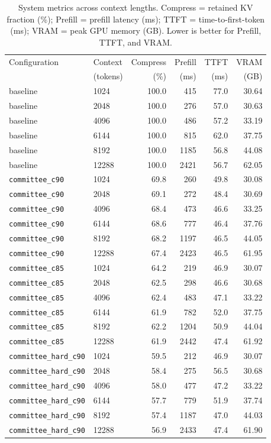 \documentclass[letterpaper]{article} %
\begin{document}
\begin{table}[t]
\centering
\small
\caption{System metrics across context lengths. Compress = retained KV fraction (\%);
Prefill = prefill latency (ms); TTFT = time-to-first-token (ms);
VRAM = peak GPU memory (GB). Lower is better for Prefill, TTFT, and VRAM.}
\label{tab:system_metrics}
\begin{tabular}{llrrrr}
\toprule
Configuration & Context & Compress & Prefill & TTFT & VRAM \\
              & (tokens) & (\%) & (ms) & (ms) & (GB) \\
\midrule
baseline            & 1024  & 100.0 & 415  & 77.0 & 30.64 \\
baseline            & 2048  & 100.0 & 276  & 57.0 & 30.63 \\
baseline            & 4096  & 100.0 & 486  & 57.2 & 33.19 \\
baseline            & 6144  & 100.0 & 815  & 62.0 & 37.75 \\
baseline            & 8192  & 100.0 & 1185 & 56.8 & 44.08 \\
baseline            & 12288 & 100.0 & 2421 & 56.7 & 62.05 \\
\midrule
\texttt{committee\_c90}  & 1024  & 69.8 & 260  & 49.8 & 30.08 \\
\texttt{committee\_c90}  & 2048  & 69.1 & 272  & 48.4 & 30.69 \\
\texttt{committee\_c90}  & 4096  & 68.4 & 473  & 46.6 & 33.25 \\
\texttt{committee\_c90}  & 6144  & 68.6 & 777  & 46.4 & 37.76 \\
\texttt{committee\_c90}  & 8192  & 68.2 & 1197 & 46.5 & 44.05 \\
\texttt{committee\_c90}  & 12288 & 67.4 & 2423 & 46.5 & 61.95 \\
\midrule
\texttt{committee\_c85}  & 1024  & 64.2 & 219  & 46.9 & 30.07 \\
\texttt{committee\_c85}  & 2048  & 62.5 & 298  & 46.6 & 30.68 \\
\texttt{committee\_c85}  & 4096  & 62.4 & 483  & 47.1 & 33.22 \\
\texttt{committee\_c85}  & 6144  & 61.9 & 782  & 52.0 & 37.75 \\
\texttt{committee\_c85}  & 8192  & 62.2 & 1204 & 50.9 & 44.04 \\
\texttt{committee\_c85}  & 12288 & 61.9 & 2442 & 47.4 & 61.92 \\
\midrule
\texttt{committee\_hard\_c90} & 1024  & 59.5 & 212  & 46.9 & 30.07 \\
\texttt{committee\_hard\_c90} & 2048  & 58.4 & 275  & 56.5 & 30.68 \\
\texttt{committee\_hard\_c90} & 4096  & 58.0 & 477  & 47.2 & 33.22 \\
\texttt{committee\_hard\_c90} & 6144  & 57.7 & 779  & 51.9 & 37.74 \\
\texttt{committee\_hard\_c90} & 8192  & 57.4 & 1187 & 47.0 & 44.03 \\
\texttt{committee\_hard\_c90} & 12288 & 56.9 & 2433 & 47.4 & 61.90 \\
\bottomrule
\end{tabular}
\end{table}
\end{document}
